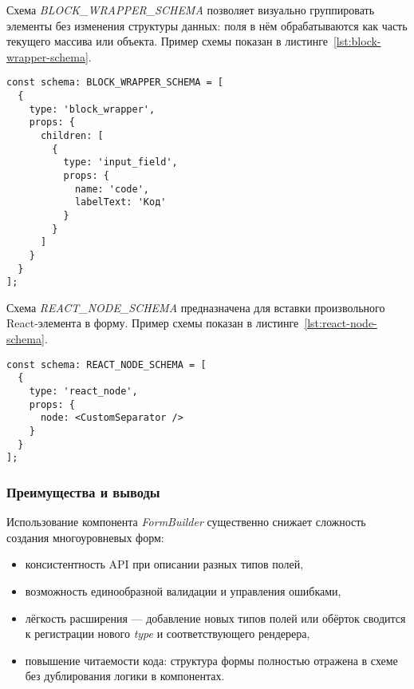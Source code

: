 Схема \textit{BLOCK\_WRAPPER\_SCHEMA} позволяет визуально группировать элементы без изменения структуры данных: поля в нём обрабатываются как часть текущего массива или объекта. Пример схемы показан в листинге~\ref{lst:block-wrapper-schema}.

\begin{lstlisting}[caption={Пример \textit{BLOCK\_WRAPPER\_SCHEMA}},label={lst:block-wrapper-schema}]
const schema: BLOCK_WRAPPER_SCHEMA = [
  {
    type: 'block_wrapper',
    props: {
      children: [
        {
          type: 'input_field',
          props: {
            name: 'code',
            labelText: 'Код'
          }
        }
      ]
    }
  }
];
\end{lstlisting}

Схема \textit{REACT\_NODE\_SCHEMA} предназначена для вставки произвольного React-элемента в форму. Пример схемы показан в листинге~\ref{lst:react-node-schema}.

\begin{lstlisting}[caption={Пример \textit{REACT\_NODE\_SCHEMA}},label={lst:react-node-schema}]
const schema: REACT_NODE_SCHEMA = [
  {
    type: 'react_node',
    props: {
      node: <CustomSeparator />
    }
  }
];
\end{lstlisting}

\subsubsection{Преимущества и выводы}
Использование компонента \textit{FormBuilder} существенно снижает сложность создания многоуровневых форм:
\begin{itemize}
  \item консистентность API при описании разных типов полей,
  \item возможность единообразной валидации и управления ошибками,
  \item лёгкость расширения — добавление новых типов полей или обёрток сводится к регистрации нового \textit{type} и соответствующего рендерера,
  \item повышение читаемости кода: структура формы полностью отражена в схеме без дублирования логики в компонентах.
\end{itemize}

